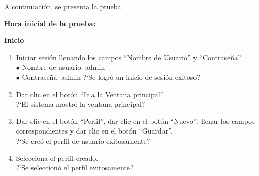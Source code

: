 A continuación, se presenta la prueba.

\textbf{Hora inicial de la prueba:\_\_\_\_\_\_\_\_\_\_\_\_}

\textbf{Inicio}

\begin{enumerate}
	\item {Iniciar sesión llenando los campos ``Nombre de Usuario'' y ``Contraseña''.\\
			$\bullet$ Nombre de usuario: admin\\
			$\bullet$ Contraseña: admin
	}
	?`Se logró un inicio de sesión exitoso?
	
	\item {Dar clic en el botón ``Ir a la Ventana principal''.\\
			?`El sistema mostró la ventana principal?
	}
	\item {Dar clic en el botón ``Perfil'', dar clic en el botón ``Nuevo'', llenar los campos correspondientes y dar clic en el botón ``Guardar''.\\
			?`Se creó el perfil de usuario exitosamente?
	}
	\item {Selecciona el perfil creado.\\
			?`Se seleccionó el perfil exitosamente?
	}
	

\end{enumerate}
